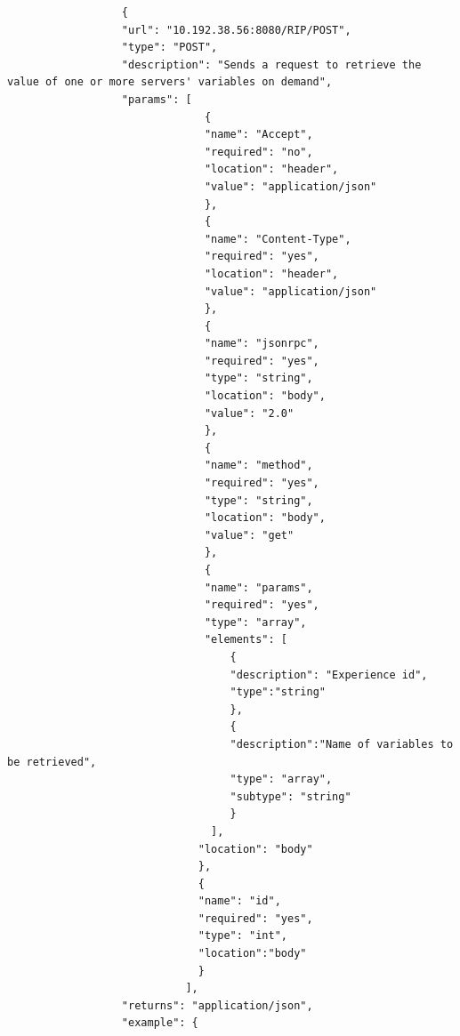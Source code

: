 \begin{lstlisting}
                  {
                  "url": "10.192.38.56:8080/RIP/POST",
                  "type": "POST",
                  "description": "Sends a request to retrieve the value of one or more servers' variables on demand",
                  "params": [
                               {
                               "name": "Accept",
                               "required": "no",
                               "location": "header",
                               "value": "application/json"
                               },
                               {
                               "name": "Content-Type",
                               "required": "yes",
                               "location": "header",
                               "value": "application/json"
                               },
                               {
                               "name": "jsonrpc",
                               "required": "yes",
                               "type": "string",
                               "location": "body",
                               "value": "2.0"
                               },
                               {
                               "name": "method",
                               "required": "yes",
                               "type": "string",
                               "location": "body",
                               "value": "get"
                               },
                               {
                               "name": "params",
                               "required": "yes",
                               "type": "array",
                               "elements": [
                                   {
                                   "description": "Experience id",
                                   "type":"string"
                                   },
                                   {
                                   "description":"Name of variables to be retrieved",
                                   "type": "array",
                                   "subtype": "string"
                                   }
                                ],
                              "location": "body"
                              },
                              {
                              "name": "id",
                              "required": "yes",
                              "type": "int",
                              "location":"body"
                              }
                            ],
                  "returns": "application/json",
                  "example": {

\end{lstlisting}

